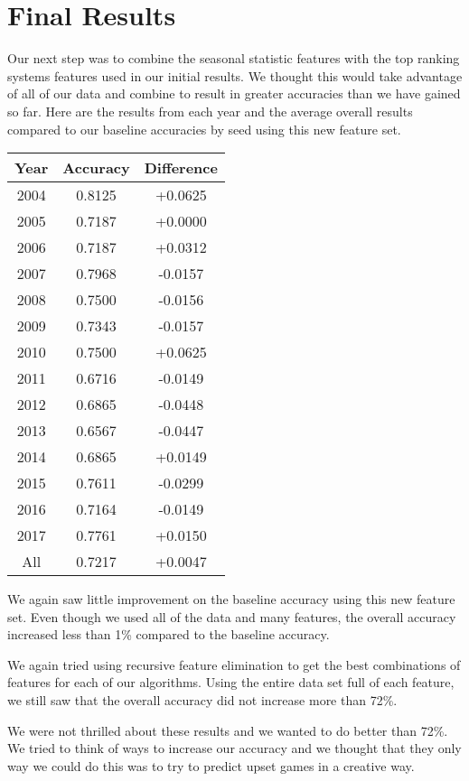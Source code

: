 \section{Final Results}

Our next step was to combine the seasonal statistic features with the top ranking systems features used in our initial results. 
We thought this would take advantage of all of our data and combine to result in greater accuracies than we have gained so far. 
Here are the results from each year and the average overall results compared to our baseline accuracies by seed using this new feature set.


\vspace{0.5cm}
\begin{tabular}{c c c}
    \toprule
    Year & Accuracy & Difference\\
    \midrule
    2004 & 0.8125 & +0.0625\\
    2005 & 0.7187 & +0.0000\\
    2006 & 0.7187 & +0.0312\\
    2007 & 0.7968 & -0.0157\\
    2008 & 0.7500 & -0.0156\\
    2009 & 0.7343 & -0.0157\\
    2010 & 0.7500 & +0.0625\\
    2011 & 0.6716 & -0.0149\\
    2012 & 0.6865 & -0.0448\\
    2013 & 0.6567 & -0.0447\\
    2014 & 0.6865 & +0.0149\\
    2015 & 0.7611 & -0.0299\\
    2016 & 0.7164 & -0.0149\\
    2017 & 0.7761 & +0.0150\\
    All & 0.7217 & +0.0047\\
    \bottomrule
\end{tabular}
\vspace{0.5cm}

We again saw little improvement on the baseline accuracy using this new feature set. 
Even though we used all of the data and many features, the overall accuracy increased less than 1\% compared to the baseline accuracy. 

We again tried using recursive feature elimination to get the best combinations of features for each of our algorithms. 
Using the entire data set full of each feature, we still saw that the overall accuracy did not increase more than 72\%. 

We were not thrilled about these results and we wanted to do better than 72\%. 
We tried to think of ways to increase our accuracy and we thought that they only way we could do this was to try to predict upset games in a creative way.